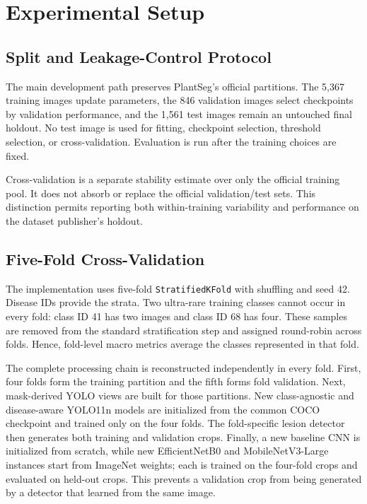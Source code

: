 \documentclass[conference]{IEEEtran}
\begin{document}
\section{Experimental Setup}

\subsection{Split and Leakage-Control Protocol}

The main development path preserves PlantSeg's official partitions. The 5,367 training images
update parameters, the 846 validation images select checkpoints by validation performance, and the
1,561 test images remain an untouched final holdout. No test image is used for fitting, checkpoint
selection, threshold selection, or cross-validation. Evaluation is run after the training choices
are fixed.

Cross-validation is a separate stability estimate over only the official training pool. It does not
absorb or replace the official validation/test sets. This distinction permits reporting both
within-training variability and performance on the dataset publisher's holdout.

\subsection{Five-Fold Cross-Validation}

The implementation uses five-fold \texttt{StratifiedKFold} with shuffling and seed 42. Disease IDs
provide the strata. Two ultra-rare training classes cannot occur in every fold: class ID 41 has two
images and class ID 68 has four. These samples are removed from the standard stratification step and
assigned round-robin across folds. Hence, fold-level macro metrics average the classes represented in
that fold.

The complete processing chain is reconstructed independently in every fold. First, four folds form
the training partition and the fifth forms fold validation. Next, mask-derived YOLO views are built
for those partitions. New class-agnostic and disease-aware YOLO11n models are initialized from the
common COCO checkpoint and trained only on the four folds. The fold-specific lesion detector then
generates both training and validation crops. Finally, a new baseline CNN is initialized from
scratch, while new EfficientNetB0 and MobileNetV3-Large instances start from ImageNet weights; each
is trained on the four-fold crops and evaluated on held-out crops. This prevents a validation crop
from being generated by a detector that learned from the same image.
\end{document}
